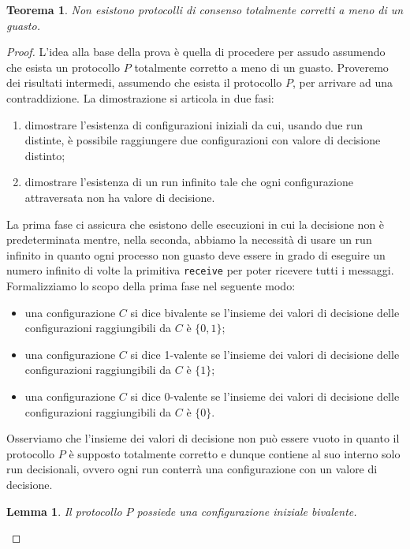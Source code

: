 \documentclass{article}
\newtheorem{lemma}{Lemma}
\newtheorem{teorema}{Teorema}
\begin{document}
\begin{teorema}
Non esistono protocolli di consenso totalmente corretti a meno di un guasto.
\end{teorema}

\begin{proof}
L'idea alla base della prova è quella di procedere per assudo assumendo che esista un protocollo $P$ totalmente corretto a meno di un guasto. Proveremo dei risultati intermedi, assumendo che esista il protocollo $P$, per arrivare ad una contraddizione. La dimostrazione si articola in due fasi:
\begin{enumerate}
\item dimostrare l'esistenza di configurazioni iniziali da cui, usando due run distinte, è possibile raggiungere due configurazioni con valore di decisione distinto;
\item dimostrare l'esistenza di un run infinito tale che ogni configurazione attraversata non ha valore di decisione.
\end{enumerate}
La prima fase ci assicura che esistono delle esecuzioni in cui la decisione non è predeterminata mentre, nella seconda, abbiamo la necessità di usare un run infinito in quanto ogni processo non guasto deve essere in grado di eseguire un numero infinito di volte la primitiva \texttt{receive} per poter ricevere tutti i messaggi.\\
Formalizziamo lo scopo della prima fase nel seguente modo: 
\begin{itemize}
\item una configurazione $C$ si dice bivalente se l'insieme dei valori di decisione delle configurazioni raggiungibili da $C$ è $\{0,1\}$;
\item una configurazione $C$ si dice 1-valente se l'insieme dei valori di decisione delle configurazioni raggiungibili da $C$ è $\{1\}$;
\item una configurazione $C$ si dice 0-valente se l'insieme dei valori di decisione delle configurazioni raggiungibili da $C$ è $\{0\}$.
\end{itemize}

Osserviamo che l'insieme dei valori di decisione non può essere vuoto in quanto il protocollo $P$ è supposto totalmente corretto e dunque contiene al suo interno solo run decisionali, ovvero ogni run conterrà una configurazione con un valore di decisione.

\begin{lemma}
Il protocollo $P$ possiede una configurazione iniziale bivalente.
\end{lemma}


\end{proof}
\end{document}
